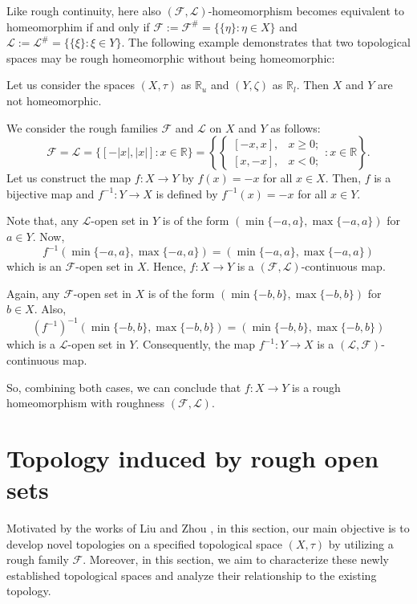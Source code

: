 \documentclass[11pt]{amsart}
\begin{document}
Like rough continuity, here also $(\mathscr{F},\mathscr{L})$-homeomorphism becomes equivalent to homeomorphim if and only if $\mathscr{F}:=\mathscr{F^\#}=\{\{\eta\}: \eta\in X\}$ and $\mathscr{L}:=\mathscr{L}^\#=\{\{\xi\}:\xi\in Y\}.$ The following example demonstrates that two topological spaces may be rough homeomorphic without being homeomorphic:
 \begin{example}
     Let us consider the spaces $(X,\tau)$ as $\mathbb{R}_u$ and $(Y,\zeta)$ as $\mathbb{R}_l$. Then $X$ and $Y$ are not homeomorphic.
     
     We consider the rough families $\mathscr{F}$ and $\mathscr{L}$ on $X$ and $Y$ as follows:
    $$\mathscr{F}=\mathscr{L}=\{[-|x|,|x|]:x\in \mathbb{R}\}=\left\{\begin{cases}
        [-x,x], &x\ge 0;\\
         [x,-x], &x<0;
     \end{cases}: x\in \mathbb{R}\right\}.$$
     Let us construct the map $f: X\to Y$ by $f(x)=-x$ for all $x\in X$. Then, $f$ is a bijective map and $f^{-1}: Y\to X$ is defined by $f^{-1}(x)=-x$ for all $x\in Y$.

     Note that, any $\mathscr{L}$-open set in $Y$ is of the form $(\min\{-a,a\},\max\{-a,a\})$ for $a\in Y$. Now, $$f^{-1}(\min\{-a,a\},\max\{-a,a\})=(\min\{-a,a\},\max\{-a,a\})$$
     which is an $\mathscr{F}$-open set in $X$. Hence, $f: X\to Y$ is a $(\mathscr{F},\mathscr{L})$-continuous map.

     Again, any $\mathscr{F}$-open set in $X$ is of the form $(\min\{-b,b\},\max\{-b,b\})$ for $b\in X$. Also,
    $$\left(f^{-1}\right)^{-1}(\min\{-b,b\},\max\{-b,b\})=(\min\{-b,b\},\max\{-b,b\})$$
     which is a $\mathscr{L}$-open set in $Y$. Consequently, the map $f^{-1}: Y\to X$ is a $(\mathscr{L},\mathscr{F})$-continuous map. 
     
     So, combining both cases, we can conclude that $f: X\to Y$ is a rough homeomorphism with roughness $(\mathscr{F},\mathscr{L})$.
 \end{example}




\section{Topology induced by rough open sets}\label{Sec4} 

 
Motivated by the works of Liu \cite{Liu3} and Zhou \cite{Zhou}, in this section, our main objective is to develop novel topologies on a specified topological space $(X,\tau)$ by utilizing a rough family $\mathscr{F}$. Moreover, in this section, we aim to characterize these newly established topological spaces and analyze their relationship to the existing topology.
\end{document}
